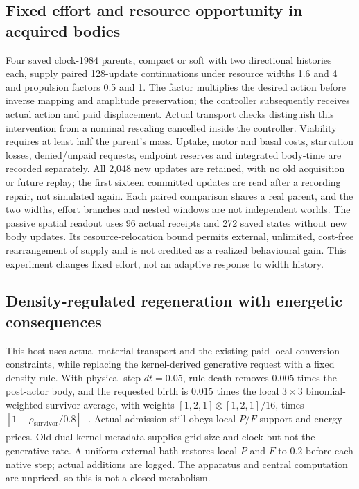 \subsection*{Fixed effort and resource opportunity in acquired bodies}
Four saved clock-1984 parents, compact or soft with two directional histories each, supply paired 128-update continuations under resource widths 1.6 and 4 and propulsion factors 0.5 and 1. The factor multiplies the desired action before inverse mapping and amplitude preservation; the controller subsequently receives actual action and paid displacement. Actual transport checks distinguish this intervention from a nominal rescaling cancelled inside the controller. Viability requires at least half the parent's mass. Uptake, motor and basal costs, starvation losses, denied/unpaid requests, endpoint reserves and integrated body-time are recorded separately. All 2,048 new updates are retained, with no old acquisition or future replay; the first sixteen committed updates are read after a recording repair, not simulated again. Each paired comparison shares a real parent, and the two widths, effort branches and nested windows are not independent worlds. The passive spatial readout uses 96 actual receipts and 272 saved states without new body updates. Its resource-relocation bound permits external, unlimited, cost-free rearrangement of supply and is not credited as a realized behavioural gain. This experiment changes fixed effort, not an adaptive response to width history.

\subsection*{Density-regulated regeneration with energetic consequences}

This host uses actual material transport and the existing paid local conversion constraints, while replacing the kernel-derived generative request with a fixed density rule. With physical step $dt=0.05$, rule death removes $0.005$ times the post-actor body, and the requested birth is $0.015$ times the local $3\times3$ binomial-weighted survivor average, with weights $[1,2,1]\otimes[1,2,1]/16$, times $[1-\rho_{\mathrm{survivor}}/0.8]_+$. Actual admission still obeys local $P/F$ support and energy prices. Old dual-kernel metadata supplies grid size and clock but not the generative rate. A uniform external bath restores local $P$ and $F$ to $0.2$ before each native step; actual additions are logged. The apparatus and central computation are unpriced, so this is not a closed metabolism.

